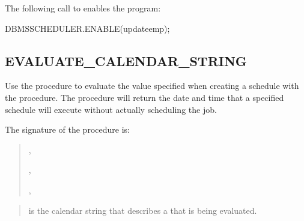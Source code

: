 \documentclass[letterpaper,10pt,english,openany,oneside]{sphinxmanual}
\begin{document}

The following call to  enables the 
program:

%
\begin{sphinxVerbatim}[commandchars=\\\{\}]
DBMS\PYGZus{}SCHEDULER.ENABLE(\PYGZsq{}update\PYGZus{}emp\PYGZsq{});
\end{sphinxVerbatim}

\newpage


\subsection{EVALUATE\_CALENDAR\_STRING}
\label{\detokenize{evaluate_calendar_string::doc}}\label{\detokenize{evaluate_calendar_string:evaluate-calendar-string}}
Use the  procedure to evaluate the
 value specified when creating a schedule with the
 procedure. The  procedure
will return the date and time that a specified schedule will execute
without actually scheduling the job.

The signature of the  procedure is:
\begin{quote}

\begin{DUlineblock}{0em}
\item[] 
\item[] ,
\item[] ,
\item[] ,
\item[] 
\end{DUlineblock}
\end{quote}


\begin{quote}

 is the calendar string that describes a
 that is being evaluated.
\end{quote}
\end{document}
